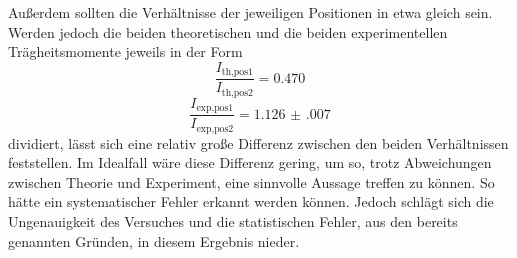 Außerdem sollten die Verhältnisse der jeweiligen Positionen in etwa gleich sein. Werden jedoch die beiden theoretischen und die beiden experimentellen Trägheitsmomente jeweils in der Form
\begin{equation}
    \frac{I_\text{th,pos1}}{I_\text{th,pos2}}=\num{0.470}
\end{equation}
\begin{equation}
    \frac{I_\text{exp,pos1}}{I_\text{exp,pos2}}=\num{1.126(007)}
\end{equation}
dividiert, lässt sich eine relativ große Differenz zwischen den beiden Verhältnissen feststellen.
Im Idealfall wäre diese Differenz gering, um so, trotz Abweichungen zwischen Theorie und Experiment, eine sinnvolle Aussage treffen zu können. So hätte ein systematischer Fehler erkannt werden können. Jedoch schlägt sich die Ungenauigkeit des Versuches und die statistischen Fehler, aus den bereits genannten Gründen, in diesem Ergebnis nieder.



